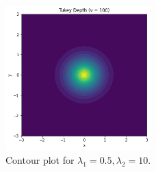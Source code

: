 \begin{figure}[htbp]
  \centering
  \includegraphics[width=0.5\textwidth]{images/TD_v100.png}
  \caption{Contour plot for $\lambda_1=0.5,\lambda_2=10$.}
  \label{fig:1.3}
\end{figure}

